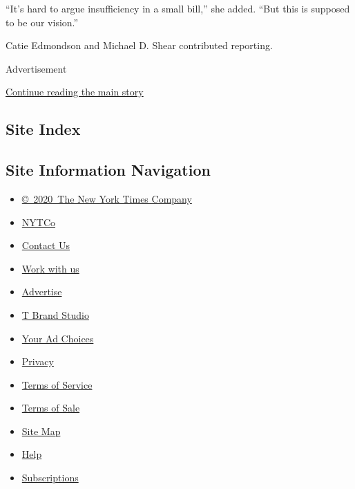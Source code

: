 ``It's hard to argue insufficiency in a small bill,'' she added. ``But
this is supposed to be our vision.''

Catie Edmondson and Michael D. Shear contributed reporting.

Advertisement

\protect\hyperlink{after-bottom}{Continue reading the main story}

\hypertarget{site-index}{%
\subsection{Site Index}\label{site-index}}

\hypertarget{site-information-navigation}{%
\subsection{Site Information
Navigation}\label{site-information-navigation}}

\begin{itemize}
\tightlist
\item
  \href{https://help.nytimes3xbfgragh.onion/hc/en-us/articles/115014792127-Copyright-notice}{©~2020~The
  New York Times Company}
\end{itemize}

\begin{itemize}
\tightlist
\item
  \href{https://www.nytco.com/}{NYTCo}
\item
  \href{https://help.nytimes3xbfgragh.onion/hc/en-us/articles/115015385887-Contact-Us}{Contact
  Us}
\item
  \href{https://www.nytco.com/careers/}{Work with us}
\item
  \href{https://nytmediakit.com/}{Advertise}
\item
  \href{http://www.tbrandstudio.com/}{T Brand Studio}
\item
  \href{https://www.nytimes3xbfgragh.onion/privacy/cookie-policy\#how-do-i-manage-trackers}{Your
  Ad Choices}
\item
  \href{https://www.nytimes3xbfgragh.onion/privacy}{Privacy}
\item
  \href{https://help.nytimes3xbfgragh.onion/hc/en-us/articles/115014893428-Terms-of-service}{Terms
  of Service}
\item
  \href{https://help.nytimes3xbfgragh.onion/hc/en-us/articles/115014893968-Terms-of-sale}{Terms
  of Sale}
\item
  \href{https://spiderbites.nytimes3xbfgragh.onion}{Site Map}
\item
  \href{https://help.nytimes3xbfgragh.onion/hc/en-us}{Help}
\item
  \href{https://www.nytimes3xbfgragh.onion/subscription?campaignId=37WXW}{Subscriptions}
\end{itemize}
